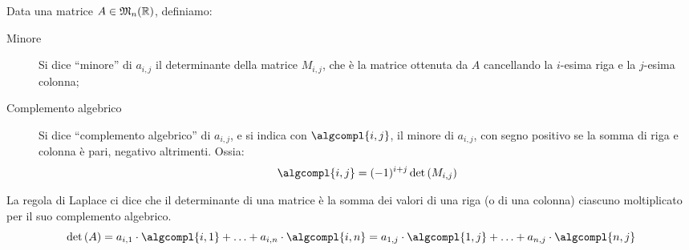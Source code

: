 Data una matrice $A \in \mathfrak{M}_{n} (\mathbb{R})$, definiamo:
\begin{description}
    \item[Minore] Si dice ``minore'' di $a_{i,j}$ il determinante della matrice $M_{i,j}$, che \`e la matrice ottenuta da $A$ cancellando la $i$-esima riga e la $j$-esima colonna;
    \item[Complemento algebrico] Si dice ``complemento algebrico'' di $a_{i,j}$, e si indica con $\algcompl{i,j}$, il minore di $a_{i,j}$, con segno positivo se la somma di riga e colonna \`e pari, negativo altrimenti. Ossia:
    \[
    \algcompl{i,j} = (-1)^{i+j} \det{M_{i,j}}
    \]
\end{description}
La regola di Laplace ci dice che il determinante di una matrice \`e la somma dei valori di una riga (o di una colonna) ciascuno moltiplicato per il suo complemento algebrico.
\[
\det{A} = a_{i,1} \cdot \algcompl{i,1} + \ldots + a_{i,n} \cdot \algcompl{i,n} =
a_{1,j} \cdot \algcompl{1,j} + \ldots + a_{n,j} \cdot \algcompl{n,j}
\]
